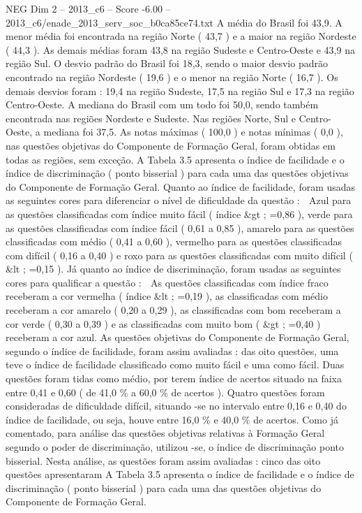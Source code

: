 \begin{textsample}{NEG Dim 2 – 2013\_c6 – Score -6.00 – 2013\_c6/enade\_2013\_serv\_soc\_b0ca85ce74.txt}
A média do Brasil foi 43,9.
A menor média foi encontrada na região Norte ( 43,7 ) e a maior na região Nordeste ( 44,3 ).
As demais médias foram 43,8 na região Sudeste e Centro-Oeste e 43,9 na região Sul.
O desvio padrão do Brasil foi 18,3, sendo o maior desvio padrão encontrado na região Nordeste ( 19,6 ) e o menor na região Norte ( 16,7 ).
Os demais desvios foram : 19,4 na região Sudeste, 17,5 na região Sul e 17,3 na região Centro-Oeste.
A mediana do Brasil com um todo foi 50,0, sendo também encontrada nas regiões Nordeste e Sudeste.
Nas regiões Norte, Sul e Centro-Oeste, a mediana foi 37,5.
As notas máximas ( 100,0 ) e notas mínimas ( 0,0 ), nas questões objetivas do Componente de Formação Geral, foram obtidas em todas as regiões, sem exceção.
A Tabela 3.5 apresenta o índice de facilidade e o índice de discriminação ( ponto bisserial ) para cada uma das questões objetivas do Componente de Formação Geral.
Quanto ao índice de facilidade, foram usadas as seguintes cores para diferenciar o nível de dificuldade da questão :  Azul para as questões classificadas com índice muito fácil ( índice \&gt ; =0,86 ), verde para as questões classificadas com índice fácil ( 0,61 a 0,85 ), amarelo para as questões classificadas com médio ( 0,41 a 0,60 ), vermelho para as questões classificadas com difícil ( 0,16 a 0,40 ) e roxo para as questões classificadas com muito difícil ( \&lt ; =0,15 ).
Já quanto ao índice de discriminação, foram usadas as seguintes cores para qualificar a questão :  As questões classificadas com índice fraco receberam a cor vermelha ( índice \&lt ; =0,19 ), as classificadas com médio receberam a cor amarelo ( 0,20 a 0,29 ), as classificadas com bom receberam a cor verde ( 0,30 a 0,39 ) e as classificadas com muito bom ( \&gt ; =0,40 ) receberam a cor azul.
As questões objetivas do Componente de Formação Geral, segundo o índice de facilidade, foram assim avaliadas : das oito questões, uma teve o índice de facilidade classificado como muito fácil e uma como fácil.
Duas questões foram tidas como médio, por terem índice de acertos situado na faixa entre 0,41 e 0,60 ( de 41,0 \% a 60,0 \% de acertos ).
Quatro questões foram consideradas de dificuldade difícil, situando -se no intervalo entre 0,16 e 0,40 do índice de facilidade, ou seja, houve entre 16,0 \% e 40,0 \% de acertos.
Como já comentado, para análise das questões objetivas relativas à Formação Geral segundo o poder de discriminação, utilizou -se, o índice de discriminação ponto bisserial.
Nesta análise, as questões foram assim avaliadas : cinco das oito questões apresentaram A Tabela 3.5 apresenta o índice de facilidade e o índice de discriminação ( ponto bisserial ) para cada uma das questões objetivas do Componente de Formação Geral.

\end{textsample}
